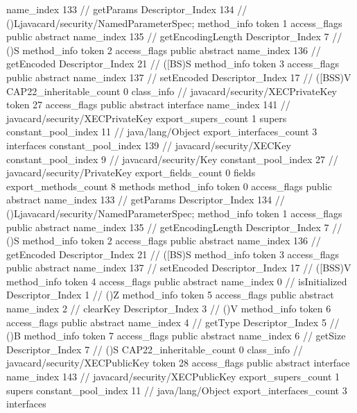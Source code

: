 {{{{{					name_index	133		// getParams
					Descriptor_Index	134		// ()Ljavacard/security/NamedParameterSpec;
				}
				method_info {
					token	1
					access_flags	public abstract
					name_index	135		// getEncodingLength
					Descriptor_Index	7		// ()S
				}
				method_info {
					token	2
					access_flags	public abstract
					name_index	136		// getEncoded
					Descriptor_Index	21		// ([BS)S
				}
				method_info {
					token	3
					access_flags	public abstract
					name_index	137		// setEncoded
					Descriptor_Index	17		// ([BSS)V
				}
			}
			CAP22_inheritable_count	0
		}
		class_info {		// javacard/security/XECPrivateKey
			token	27
			access_flags	public abstract interface
			name_index	141		// javacard/security/XECPrivateKey
			export_supers_count	1
			supers {
				constant_pool_index	11		// java/lang/Object
			}
			export_interfaces_count	3
			interfaces {
				constant_pool_index	139		// javacard/security/XECKey
				constant_pool_index	9		// javacard/security/Key
				constant_pool_index	27		// javacard/security/PrivateKey
			}
			export_fields_count	0
			fields {
			}
			export_methods_count	8
			methods {
				method_info {
					token	0
					access_flags	public abstract
					name_index	133		// getParams
					Descriptor_Index	134		// ()Ljavacard/security/NamedParameterSpec;
				}
				method_info {
					token	1
					access_flags	public abstract
					name_index	135		// getEncodingLength
					Descriptor_Index	7		// ()S
				}
				method_info {
					token	2
					access_flags	public abstract
					name_index	136		// getEncoded
					Descriptor_Index	21		// ([BS)S
				}
				method_info {
					token	3
					access_flags	public abstract
					name_index	137		// setEncoded
					Descriptor_Index	17		// ([BSS)V
				}
				method_info {
					token	4
					access_flags	public abstract
					name_index	0		// isInitialized
					Descriptor_Index	1		// ()Z
				}
				method_info {
					token	5
					access_flags	public abstract
					name_index	2		// clearKey
					Descriptor_Index	3		// ()V
				}
				method_info {
					token	6
					access_flags	public abstract
					name_index	4		// getType
					Descriptor_Index	5		// ()B
				}
				method_info {
					token	7
					access_flags	public abstract
					name_index	6		// getSize
					Descriptor_Index	7		// ()S
				}
			}
			CAP22_inheritable_count	0
		}
		class_info {		// javacard/security/XECPublicKey
			token	28
			access_flags	public abstract interface
			name_index	143		// javacard/security/XECPublicKey
			export_supers_count	1
			supers {
				constant_pool_index	11		// java/lang/Object
			}
			export_interfaces_count	3
			interfaces {
}}}}
